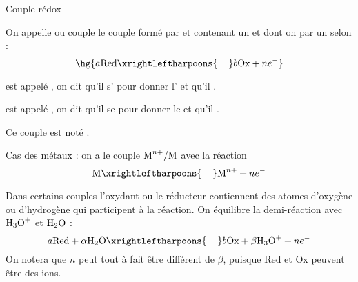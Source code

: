     \begin{definition}{Couple rédox}{}
        \begin{enumerate}
            \itast On appelle  ou couple  le couple formé par  et  contenant un  et dont on  par un  selon :
            \[ \hg{a\text{Red} \xrightleftharpoons{\hspace{0.4cm}} b\text{Ox} + ne^-}\]
        
        
            \itt {} est appelé , on dit qu'il s' pour donner l' et qu'il .
            
            \itt {} est appelé , on dit qu'il se  pour donner le  et qu'il .
        \end{enumerate}
    \end{definition}
    \begin{notation}
        Ce couple est noté .
    \end{notation}
    
    \begin{enumerate}
        \itt Cas des métaux : on a le couple $\text{M}^{n+}/\text M$ avec la réaction
        \[ \text{M} \xrightleftharpoons{\hspace{0.4cm}} \text{M}^{n+} + ne^-\]
        
        \itt Dans certains couples l'oxydant ou le réducteur contiennent des atomes d'oxygène ou d'hydrogène qui participent à la réaction. On équilibre la demi-réaction avec ${\text H_3\text O}^+$ et $\text H_2\text O$ :
        \[ a\text{Red} +\alpha \text H_2\text O\xrightleftharpoons{\hspace{0.4cm}} b\text{Ox} + \beta {\text H_3\text O}^+ + ne^- \]
        On notera que $n$ peut tout à fait être différent de $\beta$, puisque $\text{Red}$ et $\text{Ox}$ peuvent être des ions.
    \end{enumerate}
    
